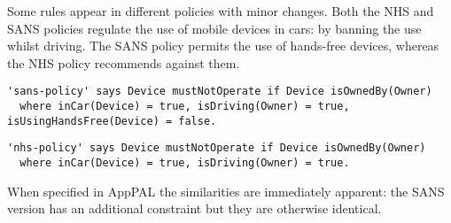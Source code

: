 \documentclass{easychair}
\newcommand{\dotdotdot}[1]{$[\cdots]$}
\begin{document}
Some rules appear in different policies with minor changes.
Both the NHS and SANS policies regulate the use of mobile devices in cars: by banning the use whilst driving.
The SANS policy permits the use of hands-free devices, whereas the NHS policy recommends against them.
\begin{lstlisting}[title={\footnotesize\textbf{SANS}:~\itshape ``%
Conducting telephone calls or utilizing handhelds while driving can be a safety hazard.
Drivers should use handhelds in hand only while parked or out of the vehicle.
If employees must use a handheld device while driving, \emph{Company} requires the use of hands-free headset devices.''}]
'sans-policy' says Device mustNotOperate if Device isOwnedBy(Owner)
  where inCar(Device) = true, isDriving(Owner) = true, isUsingHandsFree(Device) = false.
\end{lstlisting}
\begin{lstlisting}[title={\footnotesize\textbf{NHS}:~\itshape ``%
For safety reasons, Trust staff must not use a hand held mobile device whilst driving any vehicle.
\dotdotdot{It is illegal to do so. 
Please refer to the most up-to-date information via the Highways Agency.}
the Trust does not recommend using mobile devices in hands-free mode \dotdotdot{or with hands-free attachments} whilst driving.
''}]
'nhs-policy' says Device mustNotOperate if Device isOwnedBy(Owner)
  where inCar(Device) = true, isDriving(Owner) = true.
\end{lstlisting}
When specified in AppPAL the similarities are immediately apparent: the SANS version has an additional constraint but they are otherwise identical.
\end{document}

